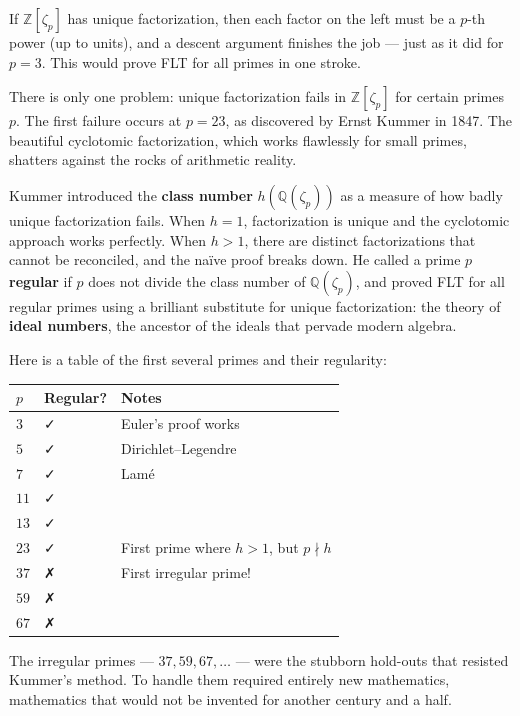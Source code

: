 If $\mathbb{Z}[\zeta_p]$ has unique factorization, then each factor on the left must be a $p$-th power (up to units), and a descent argument finishes the job --- just as it did for $p = 3$. This would prove FLT for all primes in one stroke.

There is only one problem: unique factorization fails in $\mathbb{Z}[\zeta_p]$ for certain primes $p$. The first failure occurs at $p = 23$, as discovered by Ernst Kummer in 1847. The beautiful cyclotomic factorization, which works flawlessly for small primes, shatters against the rocks of arithmetic reality.

Kummer introduced the \textbf{class number} $h(\mathbb{Q}(\zeta_p))$ as a measure of how badly unique factorization fails. When $h = 1$, factorization is unique and the cyclotomic approach works perfectly. When $h > 1$, there are distinct factorizations that cannot be reconciled, and the na\"ive proof breaks down. He called a prime $p$ \textbf{regular} if $p$ does not divide the class number of $\mathbb{Q}(\zeta_p)$, and proved FLT for all regular primes using a brilliant substitute for unique factorization: the theory of \textbf{ideal numbers}, the ancestor of the ideals that pervade modern algebra.

Here is a table of the first several primes and their regularity:


\begin{center}
\begin{tabular}{lll}
\toprule
$p$ & Regular? & Notes \\
\midrule
$3$ & ✓ & Euler's proof works \\
$5$ & ✓ & Dirichlet--Legendre \\
$7$ & ✓ & Lamé \\
$11$ & ✓ &  \\
$13$ & ✓ &  \\
$23$ & ✓ & First prime where $h > 1$, but $p \nmid h$ \\
$37$ & ✗ & First irregular prime! \\
$59$ & ✗ &  \\
$67$ & ✗ &  \\
\bottomrule
\end{tabular}
\end{center}


The irregular primes --- $37, 59, 67, \ldots$ --- were the stubborn hold-outs that resisted Kummer's method. To handle them required entirely new mathematics, mathematics that would not be invented for another century and a half.


